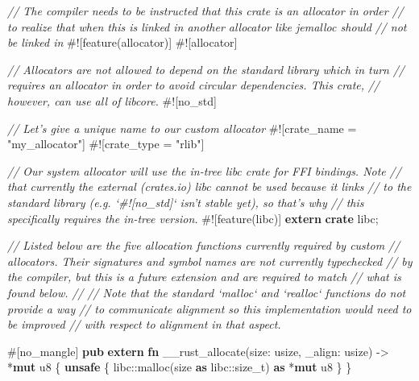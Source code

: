 \documentclass[a4paper,]{book}
\newenvironment{Shaded}{\begin{snugshade}}{\end{snugshade}}
\newcommand{\KeywordTok}[1]{\textcolor[rgb]{0.13,0.29,0.53}{\textbf{{#1}}}}
\newcommand{\DataTypeTok}[1]{\textcolor[rgb]{0.13,0.29,0.53}{{#1}}}
\newcommand{\StringTok}[1]{\textcolor[rgb]{0.31,0.60,0.02}{{#1}}}
\newcommand{\CommentTok}[1]{\textcolor[rgb]{0.56,0.35,0.01}{\textit{{#1}}}}
\newcommand{\AttributeTok}[1]{\textcolor[rgb]{0.77,0.63,0.00}{{#1}}}
\newcommand{\NormalTok}[1]{{#1}}
\begin{document}
\begin{Shaded}
\begin{Highlighting}[]
\CommentTok{// The compiler needs to be instructed that this crate is an allocator in order}
\CommentTok{// to realize that when this is linked in another allocator like jemalloc should}
\CommentTok{// not be linked in}
\AttributeTok{#![}\NormalTok{feature}\AttributeTok{(}\NormalTok{allocator}\AttributeTok{)]}
\AttributeTok{#![}\NormalTok{allocator}\AttributeTok{]}

\CommentTok{// Allocators are not allowed to depend on the standard library which in turn}
\CommentTok{// requires an allocator in order to avoid circular dependencies. This crate,}
\CommentTok{// however, can use all of libcore.}
\AttributeTok{#![}\NormalTok{no_std}\AttributeTok{]}

\CommentTok{// Let's give a unique name to our custom allocator}
\AttributeTok{#![}\NormalTok{crate_name }\AttributeTok{=} \StringTok{"my_allocator"}\AttributeTok{]}
\AttributeTok{#![}\NormalTok{crate_type }\AttributeTok{=} \StringTok{"rlib"}\AttributeTok{]}

\CommentTok{// Our system allocator will use the in-tree libc crate for FFI bindings. Note}
\CommentTok{// that currently the external (crates.io) libc cannot be used because it links}
\CommentTok{// to the standard library (e.g. `#![no_std]` isn't stable yet), so that's why}
\CommentTok{// this specifically requires the in-tree version.}
\AttributeTok{#![}\NormalTok{feature}\AttributeTok{(}\NormalTok{libc}\AttributeTok{)]}
\KeywordTok{extern} \KeywordTok{crate} \NormalTok{libc;}

\CommentTok{// Listed below are the five allocation functions currently required by custom}
\CommentTok{// allocators. Their signatures and symbol names are not currently typechecked}
\CommentTok{// by the compiler, but this is a future extension and are required to match}
\CommentTok{// what is found below.}
\CommentTok{//}
\CommentTok{// Note that the standard `malloc` and `realloc` functions do not provide a way}
\CommentTok{// to communicate alignment so this implementation would need to be improved}
\CommentTok{// with respect to alignment in that aspect.}

\AttributeTok{#[}\NormalTok{no_mangle}\AttributeTok{]}
\KeywordTok{pub} \KeywordTok{extern} \KeywordTok{fn} \NormalTok{__rust_allocate(size: }\DataTypeTok{usize}\NormalTok{, _align: }\DataTypeTok{usize}\NormalTok{) -> *}\KeywordTok{mut} \DataTypeTok{u8} \NormalTok{\{}
    \KeywordTok{unsafe} \NormalTok{\{ libc::malloc(size }\KeywordTok{as} \NormalTok{libc::}\DataTypeTok{size_t}\NormalTok{) }\KeywordTok{as} \NormalTok{*}\KeywordTok{mut} \DataTypeTok{u8} \NormalTok{\}}
\NormalTok{\}}


\end{Highlighting}
\end{Shaded}
\end{document}
